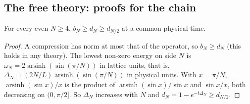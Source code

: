 \subsection*{The free theory: proofs for the chain}

\begin{proposition}\label{p:freecoarse}
For every even $N\ge4$, $b_N\ge d_N\ge d_{N/2}$ at a common physical time.
\end{proposition}
\begin{proof}
A compression has norm at most that of the operator, so $b_N\ge d_N$ (this holds in any theory). The lowest
non-zero energy on side $N$ is $\omega_N=2\operatorname{arsinh}(\sin(\pi/N))$ in lattice units, that is,
$\Delta_N=(2N/L)\operatorname{arsinh}(\sin(\pi/N))$ in physical units. With $x=\pi/N$,
$\operatorname{arsinh}(\sin x)/x$ is the product of $\operatorname{arsinh}(\sin x)/\sin x$ and $\sin x/x$,
both decreasing on $(0,\pi/2]$. So $\Delta_N$ increases with $N$ and $d_N=1-e^{-t\Delta_N}\ge d_{N/2}$.
\end{proof}

